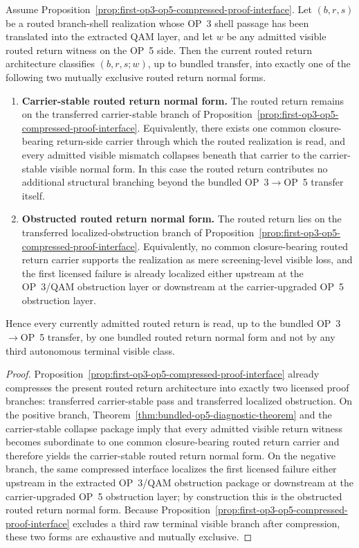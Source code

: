 \begin{theorem}
\label{thm:first-routed-return-normal-form}
Assume Proposition~\ref{prop:first-op3-op5-compressed-proof-interface}. Let $(b,r,s)$ be a routed branch-shell realization whose OP~3 shell passage has been translated into the extracted QAM layer, and let $w$ be any admitted visible routed return witness on the OP~5 side. Then the current routed return architecture classifies $(b,r,s;w)$, up to bundled transfer, into exactly one of the following two mutually exclusive routed return normal forms.
\begin{enumerate}[leftmargin=2em,label=(\roman*)]
\item \textbf{Carrier-stable routed return normal form.}
The routed return remains on the transferred carrier-stable branch of Proposition~\ref{prop:first-op3-op5-compressed-proof-interface}. Equivalently, there exists one common closure-bearing return-side carrier through which the routed realization is read, and every admitted visible mismatch collapses beneath that carrier to the carrier-stable visible normal form. In this case the routed return contributes no additional structural branching beyond the bundled OP~3$\to$OP~5 transfer itself.
\item \textbf{Obstructed routed return normal form.}
The routed return lies on the transferred localized-obstruction branch of Proposition~\ref{prop:first-op3-op5-compressed-proof-interface}. Equivalently, no common closure-bearing routed return carrier supports the realization as mere screening-level visible loss, and the first licensed failure is already localized either upstream at the OP~3/QAM obstruction layer or downstream at the carrier-upgraded OP~5 obstruction layer.
\end{enumerate}
Hence every currently admitted routed return is read, up to the bundled OP~3$\to$OP~5 transfer, by one bundled routed return normal form and not by any third autonomous terminal visible class.
\end{theorem}

\begin{proof}
Proposition~\ref{prop:first-op3-op5-compressed-proof-interface} already compresses the present routed return architecture into exactly two licensed proof branches: transferred carrier-stable pass and transferred localized obstruction. On the positive branch, Theorem~\ref{thm:bundled-op5-diagnostic-theorem} and the carrier-stable collapse package imply that every admitted visible return witness becomes subordinate to one common closure-bearing routed return carrier and therefore yields the carrier-stable routed return normal form. On the negative branch, the same compressed interface localizes the first licensed failure either upstream in the extracted OP~3/QAM obstruction package or downstream at the carrier-upgraded OP~5 obstruction layer; by construction this is the obstructed routed return normal form. Because Proposition~\ref{prop:first-op3-op5-compressed-proof-interface} excludes a third raw terminal visible branch after compression, these two forms are exhaustive and mutually exclusive.
\end{proof}

